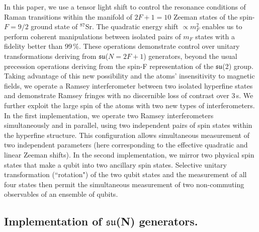 In this paper, we use a tensor light shift \cite{Deutsch2010qca} to control the resonance conditions of Raman transitions within the manifold of $2F+1=10$ Zeeman states of the spin-$F=9/2$ ground state of {$^{87}$Sr}. The quadratic energy shift $\propto m_F^2$ enables us to perform coherent manipulations between isolated pairs of $m_F$ states with a fidelity better than {99\,\%}. These operations demonstrate control over unitary transformations deriving from $\mathfrak{su}$($N = 2F+1$) generators, beyond the usual precession operations deriving from the spin-F representation of the $\mathfrak{su}$(2) group. Taking advantage of this new possibility and the atoms' insensitivity to magnetic fields, we operate a Ramsey interferometer between two isolated hyperfine states and demonstrate Ramsey fringes with no discernible loss of contrast over 3\,s. We further exploit the large spin of the atoms with two new types of interferometers. In the first implementation, we operate two Ramsey interferometers simultaneously and in parallel, using two independent pairs of spin states within the hyperfine structure. This configuration allows simultaneous measurement of two independent parameters (here corresponding to the effective quadratic and linear Zeeman shifts). In the second implementation, we mirror two physical spin states that make a qubit into two ancillary spin states. Selective unitary transformation (``rotation") of the two qubit states and the measurement of all four states then permit the simultaneous measurement of two non-commuting observables of an ensemble of qubits.


\subsection{Implementation of $\mathfrak{su}$(N) generators.}
\label{Sec:ExperimentPrinciple}

